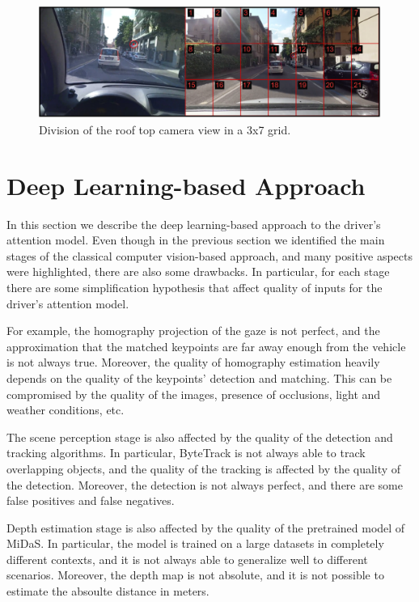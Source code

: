 \begin{figure}
\centering
\includegraphics[width=\textwidth]{images/dreyeve/rt_cam_grid.png}
\caption{Division of the roof top camera view in a 3x7 grid.}
\label{fig:rt_camera_grid}
\end{figure}


\section{Deep Learning-based Approach}
In this section we describe the deep learning-based approach to the driver's 
attention model.
Even though in the previous section we identified the main stages of the 
classical computer vision-based approach, and many positive aspects were 
highlighted, there are also some drawbacks.
In particular, for each stage there are some simplification hypothesis that 
affect quality of inputs for the driver's attention model.

For example, the homography projection of the gaze is not perfect, and the 
approximation that the matched keypoints are far away enough from the vehicle 
is not always true. Moreover, the quality of homography estimation heavily 
depends on the quality of the keypoints' detection and matching. This can be 
compromised by the quality of the images, presence of occlusions, light and 
weather conditions, etc.

The scene perception stage is also affected by the quality of the detection 
and tracking algorithms. In particular, ByteTrack is not always able to track
overlapping objects, and the quality of the tracking is affected by the 
quality of the detection. Moreover, the detection is not always perfect, and 
there are some false positives and false negatives. 

Depth estimation stage is also affected by the quality of the pretrained 
model of MiDaS. In particular, the model is trained on a large datasets in 
completely different contexts, and it is not always able to generalize well to 
different scenarios. Moreover, the depth map is not absolute, and it is not 
possible to estimate the absoulte distance in meters.

